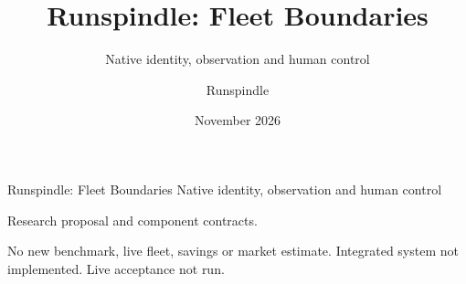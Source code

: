 \documentclass[aspectratio=169,11pt]{beamer}
\title{Runspindle: Fleet Boundaries}
\subtitle{Native identity, observation and human control}
\author{Runspindle}\date{November 2026}
\begin{document}
\begin{frame}[label=opening]{Runspindle: Fleet Boundaries}
{\Large Native identity, observation and human control}
\medskip\par Research proposal and component contracts.
\medskip\par No new benchmark, live fleet, savings or market estimate.
\vfill {\footnotesize Integrated system not implemented. Live acceptance not run.}
\end{frame}










\end{document}
